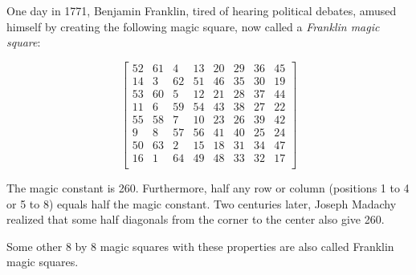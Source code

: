 \documentclass[12pt]{article}
\begin{document}
One day in 1771, Benjamin Franklin, tired of hearing political debates, amused himself by creating the following magic square, now called a {\em Franklin magic square}:

$$\begin{bmatrix}
52 & 61 & 4 & 13 & 20 & 29 & 36 & 45 \\
14 & 3 & 62 & 51 & 46 & 35 & 30 & 19 \\
53 & 60 & 5 & 12 & 21 & 28 & 37 & 44 \\
11 & 6 & 59 & 54 & 43 & 38 & 27 & 22 \\
55 & 58 & 7 & 10 & 23 & 26 & 39 & 42 \\
9 & 8 & 57 & 56 & 41 & 40 & 25 & 24 \\
50 & 63 & 2 & 15 & 18 & 31 & 34 & 47 \\
16 & 1 & 64 & 49 & 48 & 33 & 32 & 17 \\
\end{bmatrix}$$

The magic constant is 260. Furthermore, half any row or column (positions 1 to 4 or 5 to 8) equals half the magic constant. Two centuries later, Joseph Madachy realized that some half diagonals from the corner to the center also give 260.

Some other 8 by 8 magic squares with these properties are also called Franklin magic squares.
\end{document}

